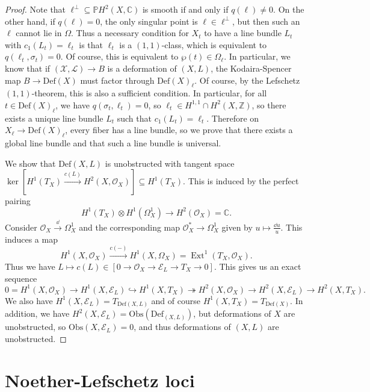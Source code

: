 \documentclass[leqno, openany]{memoir}
\theoremstyle{definition}
\theoremstyle{remark}
\theoremstyle{plain}
\theoremstyle{definition}
\theoremstyle{remark}
\newcommand{\C}{\mathbb{C}}
\newcommand{\Z}{\mathbb{Z}}
\renewcommand{\P}{\mathbb{P}}
\newcommand{\mc}[1]{\mathcal{#1}}
\newcommand{\mr}[1]{\mathrm{#1}}
\DeclareMathOperator{\Ext}{Ext}
\begin{document}
\begin{proof}
    Note that $\ell^{\perp} \subseteq \P H^2(X, \C)$ is smooth if and only if $q(\ell) \neq 0$. On the other hand, if $q(\ell) = 0$, the only singular point is $\ell \in \ell^{\perp}$, but then such an $\ell$ cannot lie in $\Omega$. Thus a necessary condition for $X_t$ to have a line bundle $L_t$ with $c_1(L_t) = \ell_t$ is that $\ell_t$ is a $(1,1)$-class, which is equivalent to $q(\ell_t, \sigma_t) = 0$. Of course, this is equivalent to $\wp(t) \in \Omega_{\ell}$. In particular, we know that if $(\mc{X}, \mc{L}) \to B$ is a deformation of $(X, L)$, the Kodaira-Spencer map $B \to \mr{Def}(X)$ must factor through ${\mr{Def}(X)}_{\ell}$. Of course, by the Lefschetz $(1,1)$-theorem, this is also a sufficient condition. In particular, for all $t \in \mr{Def}(X)_{\ell}$, we have $q(\sigma_t, \ell_t) = 0$, so $\ell_t \in H^{1,1} \cap H^2(X, \Z)$, so there exists a unique line bundle $L_t$ such that $c_1(L_t) = \ell_t$. Therefore on $X_{\ell} \to \mr{Def}(X)_{\ell}$, every fiber has a line bundle, so we prove that there exists a global line bundle and that such a line bundle is universal.

    We show that $\mr{Def}(X, L)$ is unobstructed with tangent space $\ker [H^1(T_X) \xrightarrow{c(L)} H^2(X, \mc{O}_X)] \subseteq H^1(T_X)$. This is induced by the perfect pairing
    \[ H^1(T_X) \otimes H^1(\Omega^1_X) \to H^2(\mc{O}_X) = \C. \]
    Consider $\mc{O}_X \xrightarrow{\dd} \Omega^1_X$ and the corresponding map $\mc{O}_X^* \to \Omega^1_X$ given by $u \mapsto \frac{\dd u}{u}$. This induces a map
    \[ H^1(X, \mc{O}_X) \xrightarrow{c(-)} H^1(X, \Omega_X) = \Ext^1(T_X, \mc{O}_X). \]
    Thus we have $L \mapsto c(L) \in [0 \to \mc{O}_X \to \mc{E}_L \to T_X \to 0]$. This gives us an exact sequence
    \[ 0 = H^1(X, \mc{O}_X) \to H^1(X, \mc{E}_L) \hookrightarrow H^1(X, T_X) \twoheadrightarrow H^2(X, \mc{O}_X) \to H^2(X, \mc{E}_L) \to H^2(X, T_X). \]
    We also have $H^1(X, \mc{E}_L) = T_{\mr{Def}(X, L)}$ and of course $H^1(X, T_X) = T_{\mr{Def}(X)}$. In addition, we have $H^2(X, \mc{E}_L) = \mr{Obs}(\mr{Def}_{(X,L)})$, but deformations of $X$ are unobstructed, so $\mr{Obs}(X, \mc{E}_L) = 0$, and thus deformations of $(X, L)$ are unobstructed.
\end{proof}

\section{Noether-Lefschetz loci}%
\label{sec:noether_lefschetz_loci}
\end{document}
